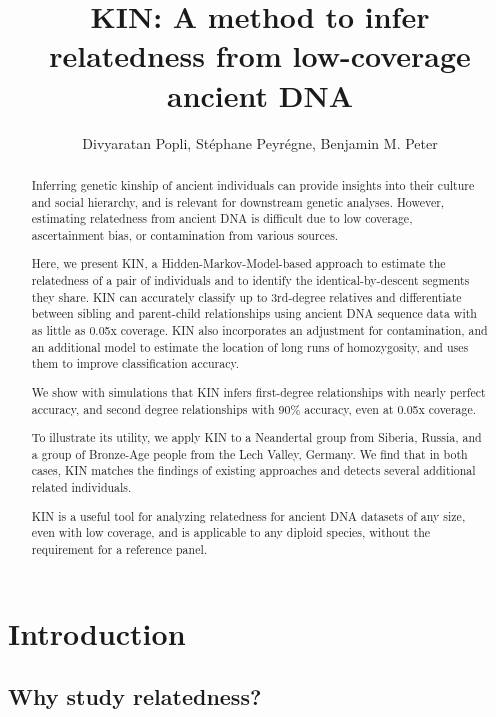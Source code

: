 \documentclass[12pt, letterpaper]{article}
\title{KIN: A method to infer relatedness from low-coverage ancient DNA}
\author{Divyaratan Popli, Stéphane Peyrégne, Benjamin M. Peter}
\begin{document}
\maketitle

\begin{abstract}

\noindent Inferring genetic kinship of ancient individuals can provide insights into their culture and social hierarchy, and is relevant for downstream genetic analyses. However, estimating relatedness from ancient DNA is difficult due to low coverage, ascertainment bias, or contamination from various sources. 

Here, we present KIN, a Hidden-Markov-Model-based approach to estimate the relatedness of a pair of individuals and to identify the identical-by-descent segments they share. KIN can accurately classify up to 3rd-degree relatives and differentiate between sibling and parent-child relationships using ancient DNA sequence data with as little as 0.05x coverage. KIN also incorporates an adjustment for contamination, and an additional model to estimate the location of long runs of homozygosity, and uses them to improve classification accuracy.

We show with simulations that KIN infers first-degree relationships with nearly perfect accuracy, and second degree relationships with 90\% accuracy, even at 0.05x coverage.

To illustrate its utility, we apply KIN to a Neandertal group from Siberia, Russia, and a group of Bronze-Age people from the Lech Valley, Germany. We find that in both cases, KIN matches the findings of existing approaches and detects several additional related individuals. 

KIN is a useful tool for analyzing relatedness for ancient DNA datasets of any size, even with low coverage, and is applicable to any diploid species, without the requirement for a reference panel.
\end{abstract}

\section{Introduction}

\subsection{Why study relatedness?}
\end{document}
